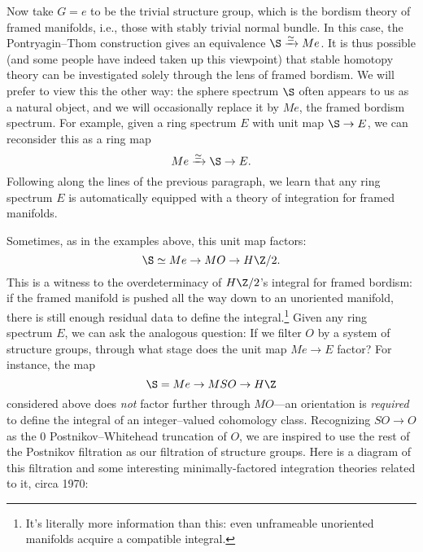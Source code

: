 Now take $G = e$ to be the trivial structure group, which is the bordism theory of framed manifolds, i.e., those with stably trivial normal bundle.  In this case, the Pontryagin--Thom construction gives an equivalence $\S \xrightarrow{\simeq} Me$.  It is thus possible (and some people have indeed taken up this viewpoint) that stable homotopy theory can be investigated solely through the lens of framed bordism.  We will prefer to view this the other way: the sphere spectrum $\S$ often appears to us as a natural object, and we will occasionally replace it by $Me$, the framed bordism spectrum.  For example, given a ring spectrum $E$ with unit map $\S \to E$, we can reconsider this as a ring map \[Me \xrightarrow{\simeq} \S \to E.\]  Following along the lines of the previous paragraph, we learn that any ring spectrum $E$ is automatically equipped with a theory of integration for framed manifolds.

Sometimes, as in the examples above, this unit map factors: \[\S \simeq Me \to MO \to H\Z/2.\]  This is a witness to the overdeterminacy of $H\Z/2$'s integral for framed bordism: if the framed manifold is pushed all the way down to an unoriented manifold, there is still enough residual data to define the integral.\footnote{It's literally more information than this: even unframeable unoriented manifolds acquire a compatible integral.}  Given any ring spectrum $E$, we can ask the analogous question: If we filter $O$ by a system of structure groups, through what stage does the unit map $Me \to E$ factor?  For instance, the map \[\S = Me \to MSO \to H\Z\] considered above does \emph{not} factor further through $MO$---an orientation is \emph{required} to define the integral of an integer--valued cohomology class.  Recognizing $SO \to O$ as the $0${\th} Postnikov--Whitehead truncation of $O$, we are inspired to use the rest of the Postnikov filtration as our filtration of structure groups.  Here is a diagram of this filtration and some interesting minimally-factored integration theories related to it, circa 1970:
\begin{center}
\end{center}

